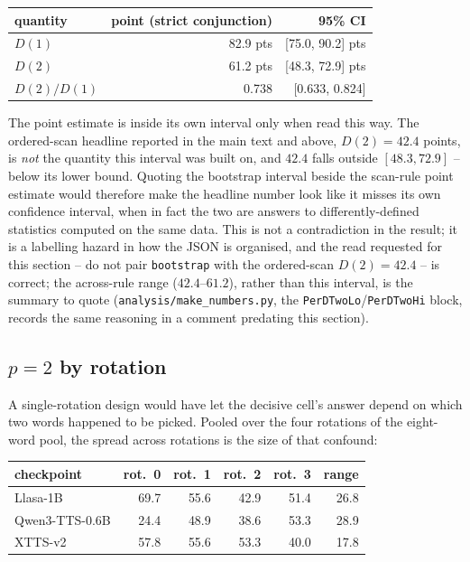 \documentclass[11pt]{article}
\begin{document}
\begin{center}
\begin{tabular}{@{}lrr@{}}
\toprule
quantity & point (strict conjunction) & 95\% CI \\
\midrule
$D(1)$ & 82.9 pts & [75.0, 90.2] pts \\
$D(2)$ & 61.2 pts & [48.3, 72.9] pts \\
$D(2)/D(1)$ & 0.738 & [0.633, 0.824] \\
\bottomrule
\end{tabular}
\end{center}

\noindent The point estimate is inside its own interval only when read this
way. The ordered-scan headline reported in the main text and above, $D(2)=42.4$
points, is \emph{not} the quantity this interval was built on, and $42.4$
falls outside $[48.3,72.9]$ -- below its lower bound. Quoting the bootstrap
interval beside the scan-rule point estimate would therefore make the
headline number look like it misses its own confidence interval, when in fact
the two are answers to differently-defined statistics computed on the same
data. This is not a contradiction in the result; it is a labelling hazard in
how the JSON is organised, and the read requested for this section -- do not
pair \texttt{bootstrap} with the ordered-scan $D(2)=42.4$ -- is correct;
the across-rule range ($42.4$--$61.2$), rather than this interval, is the
summary to quote (\texttt{analysis/make\_numbers.py},
the \texttt{PerDTwoLo}/\texttt{PerDTwoHi} block, records the same reasoning
in a comment predating this section).

\subsection{$p=2$ by rotation}

A single-rotation design would have let the decisive cell's answer depend on
which two words happened to be picked. Pooled over the four rotations of the
eight-word pool, the spread across rotations is the size of that confound:

\begin{center}
\begin{tabular}{@{}lrrrrr@{}}
\toprule
checkpoint & rot.\ 0 & rot.\ 1 & rot.\ 2 & rot.\ 3 & range \\
\midrule
Llasa-1B         & 69.7 & 55.6 & 42.9 & 51.4 & 26.8 \\
Qwen3-TTS-0.6B   & 24.4 & 48.9 & 38.6 & 53.3 & 28.9 \\
XTTS-v2          & 57.8 & 55.6 & 53.3 & 40.0 & 17.8 \\
\bottomrule
\end{tabular}
\end{center}
\end{document}
